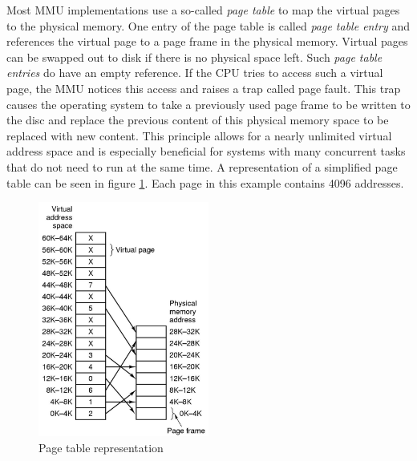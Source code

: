 Most MMU implementations use a so-called \textit{page table} to map
the virtual pages to the physical memory.
One entry of the page table is called \textit{page table entry} and
references the virtual page to a page frame in the physical
memory. Virtual pages can be swapped out to disk if there is
no physical space left. Such \textit{page table entries} do have an
empty reference. If the CPU tries to access such a virtual
page, the MMU notices this access and raises a trap called
page fault. This trap causes the operating system to take
a previously used page frame to be written to the disc
and replace the previous content of this physical memory
space to be replaced with new content.
This principle allows for a nearly unlimited virtual
address space and is especially beneficial for systems
with many concurrent tasks that do not need to run at the
same time.
A representation of a simplified page table can
be seen in figure \ref{fig:tanenbaum_page_table}.
Each page in this example contains 4096 addresses.
\begin{figure}
    \centering
    \includegraphics[width=0.5\textwidth]{figures/tanenbaum_page_table}
    \caption{Page table representation \cite[p.~188]{tanenbaum_modern_operating_systems_3}}
    \label{fig:tanenbaum_page_table}
\end{figure}

